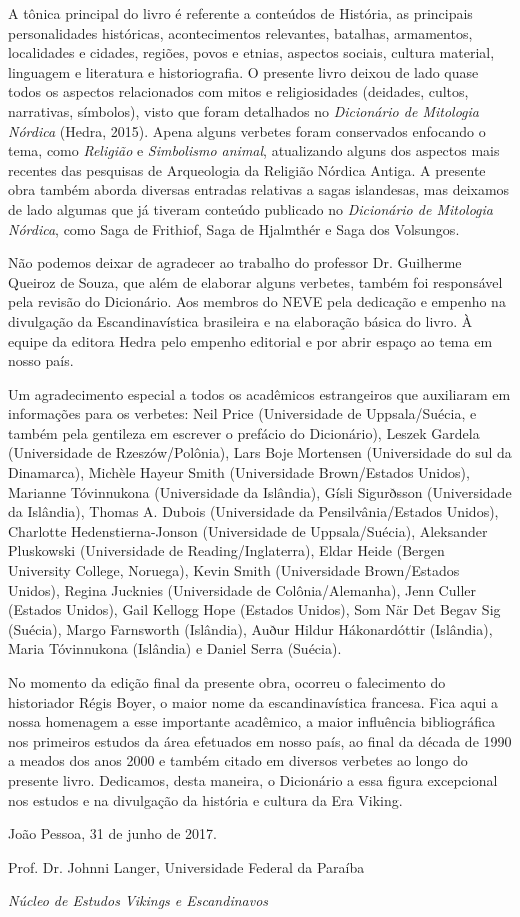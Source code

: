 A tônica principal do livro é referente a conteúdos de História, as
principais personalidades históricas, acontecimentos relevantes,
batalhas, armamentos, localidades e cidades, regiões, povos e etnias,
aspectos sociais, cultura material, linguagem e literatura e
historiografia. O presente livro deixou de lado quase todos os aspectos
relacionados com mitos e religiosidades (deidades, cultos, narrativas,
símbolos), visto que foram detalhados no \emph{Dicionário de Mitologia
Nórdica} (Hedra, 2015). Apena alguns verbetes foram conservados
enfocando o tema, como \emph{Religião} e \emph{Simbolismo animal},
atualizando alguns dos aspectos mais recentes das pesquisas de
Arqueologia da Religião Nórdica Antiga. A presente obra também aborda
diversas entradas relativas a sagas islandesas, mas deixamos de lado
algumas que já tiveram conteúdo publicado no \emph{Dicionário de
Mitologia Nórdica}, como Saga de Frithiof, Saga de Hjalmthér e Saga dos
Volsungos.

Não podemos deixar de agradecer ao trabalho do professor Dr. Guilherme
Queiroz de Souza, que além de elaborar alguns verbetes, também foi
responsável pela revisão do Dicionário. Aos membros do NEVE pela
dedicação e empenho na divulgação da Escandinavística brasileira e na
elaboração básica do livro. À equipe da editora Hedra pelo empenho
editorial e por abrir espaço ao tema em nosso país.

Um agradecimento especial a todos os acadêmicos estrangeiros que
auxiliaram em informações para os verbetes: Neil Price (Universidade de
Uppsala/Suécia, e também pela gentileza em escrever o prefácio do
Dicionário), Leszek Gardela (Universidade de Rzeszów/Polônia), Lars Boje
Mortensen (Universidade do sul da Dinamarca), Michèle Hayeur Smith
(Universidade Brown/Estados Unidos), Marianne Tóvinnukona (Universidade
da Islândia), Gísli Sigurðsson (Universidade da Islândia), Thomas A.
Dubois (Universidade da Pensilvânia/Estados Unidos), Charlotte
Hedenstierna-Jonson (Universidade de Uppsala/Suécia), Aleksander
Pluskowski (Universidade de Reading/Inglaterra), Eldar Heide (Bergen
University College, Noruega), Kevin Smith (Universidade Brown/Estados
Unidos), Regina Jucknies (Universidade de Colônia/Alemanha), Jenn Culler
(Estados Unidos), Gail Kellogg Hope (Estados Unidos), Som När Det Begav
Sig (Suécia), Margo Farnsworth (Islândia), Auður Hildur Hákonardóttir
(Islândia), Maria Tóvinnukona (Islândia) e Daniel Serra (Suécia).

No momento da edição final da presente obra, ocorreu o falecimento do
historiador Régis Boyer, o maior nome da escandinavística francesa. Fica
aqui a nossa homenagem a esse importante acadêmico, a maior influência
bibliográfica nos primeiros estudos da área efetuados em nosso país, ao
final da década de 1990 a meados dos anos 2000 e também citado em
diversos verbetes ao longo do presente livro. Dedicamos, desta maneira,
o Dicionário a essa figura excepcional nos estudos e na divulgação da
história e cultura da Era Viking.\medskip

\hfill João Pessoa, 31 de junho de 2017.

\hfill Prof. Dr. Johnni Langer, Universidade Federal da Paraíba

\hfill \emph{Núcleo de Estudos Vikings e Escandinavos}
